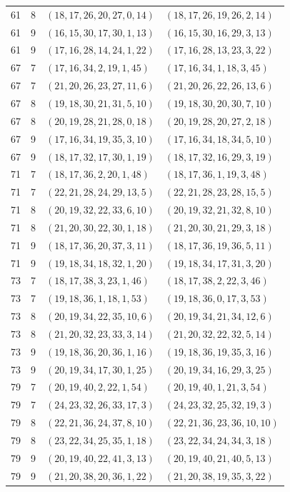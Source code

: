 \begin{longtable}{rrll}
61&8&$(18,17,26,20,27,0,14)$&$(18,17,26,19,26,2,14)$\\
61&9&$(16,15,30,17,30,1,13)$&$(16,15,30,16,29,3,13)$\\
61&9&$(17,16,28,14,24,1,22)$&$(17,16,28,13,23,3,22)$\\
67&7&$(17,16,34,2,19,1,45)$&$(17,16,34,1,18,3,45)$\\
67&7&$(21,20,26,23,27,11,6)$&$(21,20,26,22,26,13,6)$\\
67&8&$(19,18,30,21,31,5,10)$&$(19,18,30,20,30,7,10)$\\
67&8&$(20,19,28,21,28,0,18)$&$(20,19,28,20,27,2,18)$\\
67&9&$(17,16,34,19,35,3,10)$&$(17,16,34,18,34,5,10)$\\
67&9&$(18,17,32,17,30,1,19)$&$(18,17,32,16,29,3,19)$\\
71&7&$(18,17,36,2,20,1,48)$&$(18,17,36,1,19,3,48)$\\
71&7&$(22,21,28,24,29,13,5)$&$(22,21,28,23,28,15,5)$\\
71&8&$(20,19,32,22,33,6,10)$&$(20,19,32,21,32,8,10)$\\
71&8&$(21,20,30,22,30,1,18)$&$(21,20,30,21,29,3,18)$\\
71&9&$(18,17,36,20,37,3,11)$&$(18,17,36,19,36,5,11)$\\
71&9&$(19,18,34,18,32,1,20)$&$(19,18,34,17,31,3,20)$\\
73&7&$(18,17,38,3,23,1,46)$&$(18,17,38,2,22,3,46)$\\
73&7&$(19,18,36,1,18,1,53)$&$(19,18,36,0,17,3,53)$\\
73&8&$(20,19,34,22,35,10,6)$&$(20,19,34,21,34,12,6)$\\
73&8&$(21,20,32,23,33,3,14)$&$(21,20,32,22,32,5,14)$\\
73&9&$(19,18,36,20,36,1,16)$&$(19,18,36,19,35,3,16)$\\
73&9&$(20,19,34,17,30,1,25)$&$(20,19,34,16,29,3,25)$\\
79&7&$(20,19,40,2,22,1,54)$&$(20,19,40,1,21,3,54)$\\
79&7&$(24,23,32,26,33,17,3)$&$(24,23,32,25,32,19,3)$\\
79&8&$(22,21,36,24,37,8,10)$&$(22,21,36,23,36,10,10)$\\
79&8&$(23,22,34,25,35,1,18)$&$(23,22,34,24,34,3,18)$\\
79&9&$(20,19,40,22,41,3,13)$&$(20,19,40,21,40,5,13)$\\
79&9&$(21,20,38,20,36,1,22)$&$(21,20,38,19,35,3,22)$\\
\bottomrule\end{longtable}
\endgroup
